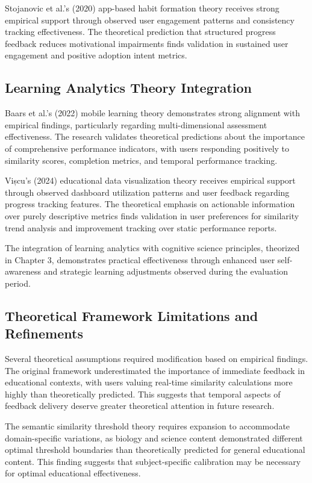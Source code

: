 {{Stojanovic et al.'s (2020) app-based habit formation theory receives strong empirical support through observed user engagement patterns and consistency tracking effectiveness. The theoretical prediction that structured progress feedback reduces motivational impairments finds validation in sustained user engagement and positive adoption intent metrics.

\subsection{Learning Analytics Theory Integration}

Baars et al.'s (2022) mobile learning theory demonstrates strong alignment with empirical findings, particularly regarding multi-dimensional assessment effectiveness. The research validates theoretical predictions about the importance of comprehensive performance indicators, with users responding positively to similarity scores, completion metrics, and temporal performance tracking.

Vișcu's (2024) educational data visualization theory receives empirical support through observed dashboard utilization patterns and user feedback regarding progress tracking features. The theoretical emphasis on actionable information over purely descriptive metrics finds validation in user preferences for similarity trend analysis and improvement tracking over static performance reports.

The integration of learning analytics with cognitive science principles, theorized in Chapter 3, demonstrates practical effectiveness through enhanced user self-awareness and strategic learning adjustments observed during the evaluation period.

\subsection{Theoretical Framework Limitations and Refinements}

Several theoretical assumptions required modification based on empirical findings. The original framework underestimated the importance of immediate feedback in educational contexts, with users valuing real-time similarity calculations more highly than theoretically predicted. This suggests that temporal aspects of feedback delivery deserve greater theoretical attention in future research.

The semantic similarity threshold theory requires expansion to accommodate domain-specific variations, as biology and science content demonstrated different optimal threshold boundaries than theoretically predicted for general educational content. This finding suggests that subject-specific calibration may be necessary for optimal educational effectiveness.

}}

